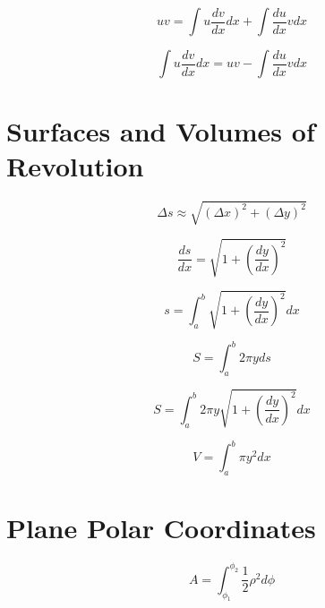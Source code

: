 \begin{equation*}
    uv = \int u \frac{dv}{dx} dx + \int \frac{du}{dx}vdx
\end{equation*}
    
\begin{equation*}
    \int u \frac{dv}{dx} dx = uv - \int \frac{du}{dx}vdx
\end{equation*}

\section{Surfaces and Volumes of Revolution}

\begin{equation*}
    \Delta s \approx \sqrt{(\Delta x)^{2} + (\Delta y)^{2}}
\end{equation*}

\begin{equation*}
    \frac{ds}{dx} = \sqrt{1 + \left(\frac{dy}{dx}\right)^2}
\end{equation*}

\begin{equation*}
    s = \int_{a}^{b}\sqrt{1 + \left(\frac{dy}{dx}\right)^{2}}dx
\end{equation*}

\begin{equation*}
    S = \int_{a}^{b} 2 \pi y ds
\end{equation*}

\begin{equation*}
    S = \int_{a}^{b} 2 \pi y \sqrt{1 + \left(\frac{dy}{dx}\right)^{2}}dx
\end{equation*}

\begin{equation*}
    V = \int_{a}^{b} \pi y^{2} dx
\end{equation*}

\section{Plane Polar Coordinates}

\begin{center}
\end{center}

\begin{equation*}
    A = \int_{\phi_1}^{\phi_2}\frac{1}{2}\rho^2 d\phi
\end{equation*}